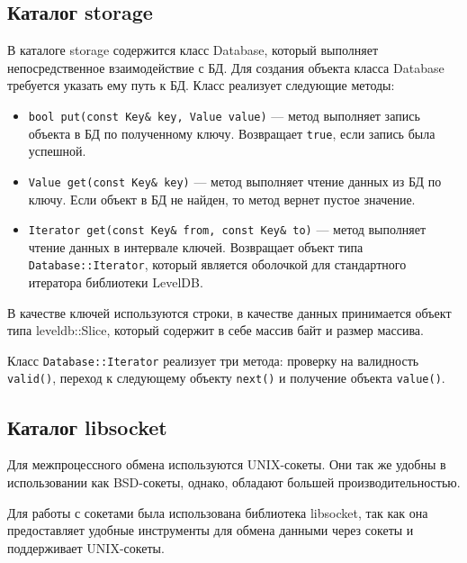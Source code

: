 \subsection{Каталог storage}
В каталоге storage содержится класс Database, который выполняет непосредственное взаимодействие с БД. Для создания объекта класса Database требуется указать ему путь к БД. Класс реализует следующие методы:
\begin{itemize}
\item \texttt{bool put(const Key\& key, Value value)} --- метод выполняет запись объекта в БД по полученному ключу. Возвращает \texttt{true}, если запись была успешной.
\item \texttt{Value get(const Key\& key)} --- метод выполняет чтение данных из БД по ключу. Если объект в БД не найден, то метод вернет пустое значение.
\item \texttt{Iterator get(const Key\& from, const Key\& to)} --- метод выполняет чтение данных в интервале ключей. Возвращает объект типа \texttt{Database::Iterator}, который является оболочкой для стандартного итератора библиотеки LevelDB.
\end{itemize}

В качестве ключей используются строки, в качестве данных принимается объект типа leveldb::Slice, который содержит в себе массив байт и размер массива. 

Класс \texttt{Database::Iterator} реализует три метода: проверку на валидность \texttt{valid()}, переход к следующему объекту \texttt{next()} и получение объекта \texttt{value()}.

\subsection{Каталог libsocket}
Для межпроцессного обмена используются UNIX-сокеты. Они так же удобны в использовании как BSD-сокеты, однако, обладают большей производительностью.

Для работы с сокетами была использована библиотека libsocket\cite{libsocket}, так как она предоставляет удобные инструменты для обмена данными через сокеты и поддерживает UNIX-сокеты.

